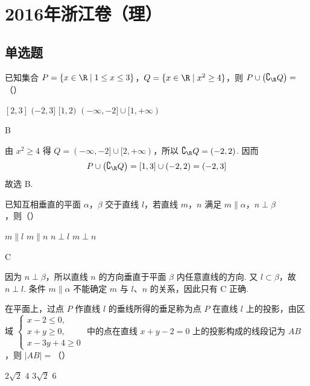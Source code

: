 
\chapter{2016年浙江卷（理）}

\section{单选题}

\begin{problem}
已知集合 \( P=\{x\in\R\mid 1\le x\le 3\} \)，\( Q=\{x\in\R\mid x^2\ge 4\} \)，则 \( P\cup \left( \complement_{\R} Q \right)= \)（\quad）

\choices
    {\([2,3]\)}
    {\(( -2,3]\)}
    {\([1,2)\)}
    {\(( -\infty,-2]\cup [1,+\infty)\)}
\end{problem}

\begin{answer}
B
\end{answer}

\begin{solution}
由 \(x^2\geqslant4\) 得 \(Q=(-\infty,-2]\cup[2,+\infty)\)，所以
\(\complement_{\R}Q=(-2,2)\). 因而
\[
P\cup\left(\complement_{\R}Q\right)=[1,3]\cup(-2,2)=(-2,3]
\]
故选 B.
\end{solution}

\begin{problem}
已知互相垂直的平面 \(\alpha\)，\(\beta\) 交于直线 \( l \)，若直线 \(m\)，\(n\) 满足 \( m\parallel \alpha \)，\( n\perp \beta \)，则（\quad）

\choices
    {\(m\parallel l\)}
    {\(m\parallel n\)}
    {\(n\perp l\)}
    {\(m\perp n\)}
\end{problem}

\begin{answer}
C
\end{answer}

\begin{solution}
因为 \(n\perp\beta\)，所以直线 \(n\) 的方向垂直于平面 \(\beta\) 内任意直线的方向. 又 \(l\subset\beta\)，故 \(n\perp l\). 条件 \(m\parallel\alpha\) 不能确定 \(m\) 与 \(l\)、\(n\) 的关系，因此只有 C 正确.
\end{solution}

\begin{problem}
在平面上，过点 \(P\) 作直线 \( l \) 的垂线所得的垂足称为点 \(P\) 在直线 \( l \) 上的投影，由区域 \( \begin{cases}
x-2\le 0,\\
x+y\ge 0,\\
x-3y+4\ge 0
\end{cases} \) 中的点在直线 \( x+y-2=0 \) 上的投影构成的线段记为 \(AB\)，则 \( |AB|= \)（\quad）

\choices
    {\(2\sqrt2\)}
    {\(4\)}
    {\(3\sqrt2\)}
    {\(6\)}
\end{problem}

